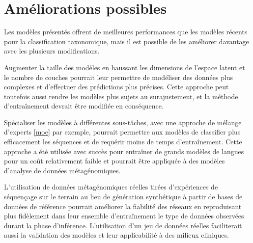 \section{Améliorations possibles}
Les modèles présentés offrent de meilleures performances que les modèles récents pour la
classification taxonomique, mais il est possible de les améliorer davantage avec les plusieurs
modifications.

Augmenter la taille des modèles en haussant les dimensions de l'espace latent et le nombre de
couches pourrait leur permettre de modéliser des données plus complexes et d'effectuer des
prédictions plus précises. Cette approche peut toutefois aussi rendre les modèles plus sujets au
surajustement, et la méthode d'entraînement devrait être modifiée en conséquence.

Spécialiser les modèles à différentes sous-tâches, avec une approche de mélange d'experts \ref{moe}
par exemple, pourrait permettre aux modèles de classifier plus efficacement les séquences et de
requérir moins de temps d'entraînement. Cette approche a été utilisée avec succès pour entraîner de
grands modèles de langues pour un coût relativement faible \cite{deepseekai2025} et pourrait être
appliquée à des modèles d'analyse de données métagénomiques.

L'utilisation de données métagénomiques réelles tirées d'expériences de séquençage sur le terrain au
lieu de génération synthétique à partir de bases de données de référence pourrait améliorer la
fiabilité des réseaux en reproduisant plus fidèlement dans leur ensemble d'entraînement le type de
données observées durant la phase d'inférence. L'utilisation d'un jeu de données réelles
faciliterait aussi la validation des modèles et leur applicabilité à des milieux cliniques.
